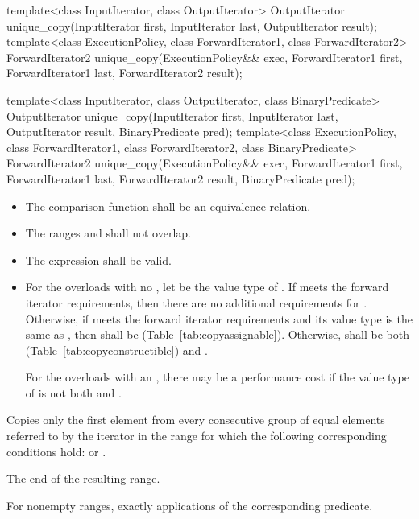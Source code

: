 %
\begin{itemdecl}
template<class InputIterator, class OutputIterator>
  OutputIterator
    unique_copy(InputIterator first, InputIterator last,
                OutputIterator result);
template<class ExecutionPolicy, class ForwardIterator1, class ForwardIterator2>
  ForwardIterator2
    unique_copy(ExecutionPolicy&& exec,
                ForwardIterator1 first, ForwardIterator1 last,
                ForwardIterator2 result);

template<class InputIterator, class OutputIterator,
         class BinaryPredicate>
  OutputIterator
    unique_copy(InputIterator first, InputIterator last,
                OutputIterator result, BinaryPredicate pred);
template<class ExecutionPolicy, class ForwardIterator1, class ForwardIterator2,
         class BinaryPredicate>
  ForwardIterator2
    unique_copy(ExecutionPolicy&& exec,
                ForwardIterator1 first, ForwardIterator1 last,
                ForwardIterator2 result, BinaryPredicate pred);
\end{itemdecl}


\begin{itemdescr}
\pnum
\requires
\begin{itemize}
\item
The comparison function shall be an equivalence relation.

\item
The ranges
and
shall not overlap.

\item
The expression
shall be valid.

\item
For the overloads with no ,
let  be the value type of .
If  meets the forward iterator requirements,
then there are no additional requirements for .
Otherwise, if  meets the forward iterator
requirements and its value type is the same as ,
then  shall be  (Table~\ref{tab:copyassignable}).
Otherwise,  shall be both
 (Table~\ref{tab:copyconstructible}) and .
\begin{note}
For the overloads with an , there may be a performance
cost if the value type of  is not both
 and .
\end{note}
\end{itemize}

\pnum
\effects
Copies only the first element from every consecutive group of equal elements referred to by
the iterator
in the range
for which the following corresponding conditions hold:
or
.

\pnum
\returns
The end of the resulting range.

\pnum
\complexity
For nonempty ranges, exactly
applications of the corresponding predicate.
\end{itemdescr}

